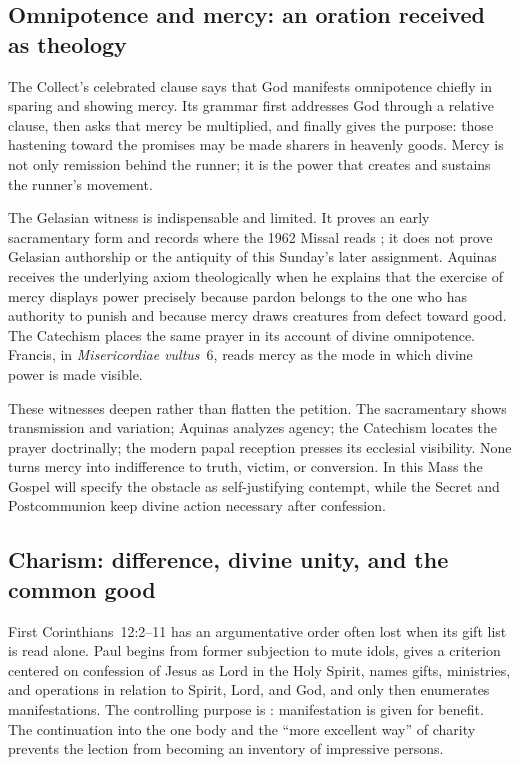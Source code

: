 \subsection*{Omnipotence and mercy: an oration received as theology\enspace{}}

The Collect's celebrated clause says that God manifests omnipotence chiefly in
sparing and showing mercy. Its grammar first addresses God through a relative
clause, then asks that mercy be multiplied, and finally gives the purpose:
those hastening toward the promises may be made sharers in heavenly goods.
Mercy is not only remission behind the runner; it is the power that creates
and sustains the runner's movement.

The Gelasian witness is indispensable and limited. It proves an early
sacramentary form and records  where the 1962 Missal reads
; it does not prove Gelasian authorship or the antiquity
of this Sunday's later assignment. Aquinas receives the underlying axiom
theologically when he explains that the exercise of mercy displays power
precisely because pardon belongs to the one who has authority to punish and
because mercy draws creatures from defect toward good. The Catechism places
the same prayer in its account of divine omnipotence. Francis, in
\emph{Misericordiae vultus}~6, reads mercy as the mode in which divine power is
made visible.

These witnesses deepen rather than flatten the petition. The sacramentary
shows transmission and variation; Aquinas analyzes agency; the Catechism
locates the prayer doctrinally; the modern papal reception presses its
ecclesial visibility. None turns mercy into indifference to truth, victim, or
conversion. In this Mass the Gospel will specify the obstacle as
self-justifying contempt, while the Secret and Postcommunion keep divine
action necessary after confession.

\subsection*{Charism: difference, divine unity, and the common good\enspace{}}

First Corinthians~12:2--11 has an argumentative order often lost when its gift
list is read alone. Paul begins from former subjection to mute idols, gives a
criterion centered on confession of Jesus as Lord in the Holy Spirit, names
gifts, ministries, and operations in relation to Spirit, Lord, and God, and
only then enumerates manifestations. The controlling purpose is
: manifestation is given for benefit. The continuation
into the one body and the ``more excellent way'' of charity prevents the
lection from becoming an inventory of impressive persons.

